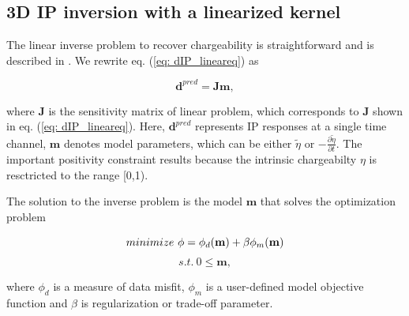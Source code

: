 \documentclass[extra,mreferee]{gji}
\newcommand{\peta}{\tilde{\eta}}
\begin{document}
\subsection{3D IP inversion with a linearized kernel}
The linear inverse problem to recover chargeability is straightforward and is described in \cite{doug1994}. 
We rewrite eq. (\ref{eq: dIP_lineareq}) as
\begin{linenomath*}
\begin{equation}
  \mathbf{d}^{pred} = \mathbf{J}\mathbf{m},
  \label{eq9}
\end{equation}
\end{linenomath*}
where $\mathbf{J}$ is the  sensitivity matrix of linear problem, which corresponds to $\mathbf{J}$ shown in eq. (\ref{eq: dIP_lineareq}). 
Here, $\mathbf{d}^{pred}$ represents IP responses at a single time channel, $\mathbf{m}$ denotes model parameters, which can be either $\peta$ or $-\frac{\partial \peta}{\partial t}$. The important positivity constraint results because the intrinsic chargeabilty $\eta$ is resctricted to the range [0,1).

The solution to the inverse problem is the model $\mathbf{m}$ that solves the optimization problem
\begin{linenomath*}
\begin{equation}
  minimize \ \phi =  \phi_d(\mathbf{m}) + \beta\phi_m(\mathbf{m}) \\
  \label{eq10}
\end{equation}
\begin{equation}
  s.t. \ 0 \le \mathbf{m}, \nonumber
\end{equation}

\end{linenomath*}
where $\phi_d$ is a measure of data misfit, $\phi_m$ is a user-defined model objective function and $\beta$ is regularization or trade-off parameter. 
\end{document}
